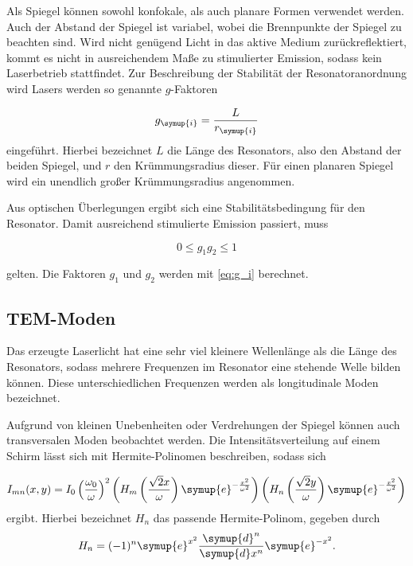 Als Spiegel können sowohl konfokale, als auch planare Formen verwendet werden. Auch der Abstand der Spiegel ist variabel, wobei die Brennpunkte der Spiegel zu beachten sind.
Wird nicht genügend Licht in das aktive Medium zurückreflektiert, kommt es nicht in ausreichendem Maße zu stimulierter Emission, sodass kein Laserbetrieb stattfindet.
Zur Beschreibung der Stabilität der Resonatoranordnung wird Lasers werden so genannte $g$-Faktoren

\begin{equation}
    g_{\symup{i}} = \frac{L}{r_{\symup{i}}}
    \label{eq:g_i}
\end{equation}
eingeführt. Hierbei bezeichnet $L$ die Länge des Resonators, also den Abstand der beiden Spiegel, und $r$ den Krümmungsradius dieser. Für einen planaren Spiegel wird ein unendlich großer
Krümmungsradius angenommen.

Aus optischen Überlegungen ergibt sich eine Stabilitätsbedingung für den Resonator. Damit ausreichend stimulierte Emission passiert, muss

\begin{equation}
    0 ≤ g_1g_2 ≤ 1
    \label{eq:g1g2}
\end{equation}

gelten. Die Faktoren $g_1$ und $g_2$ werden mit \eqref{eq:g_i} berechnet.

\subsection{TEM-Moden}
Das erzeugte Laserlicht hat eine sehr viel kleinere Wellenlänge als die Länge des Resonators, sodass mehrere Frequenzen im Resonator eine stehende Welle bilden können. Diese unterschiedlichen
Frequenzen werden als longitudinale Moden bezeichnet. 

Aufgrund von kleinen Unebenheiten oder Verdrehungen der Spiegel können auch transversalen Moden beobachtet werden. Die Intensitätsverteilung auf einem Schirm lässt sich mit Hermite-Polinomen beschreiben,
sodass sich

\begin{equation}
    I_{mn}(x,y) = I_0\left(\frac{\omega_0}{\omega}\right)^2\left(H_m\left(\frac{\sqrt{2}x}{\omega}\right)\symup{e}^{-\frac{x^2}{\omega^2}}\right)\left(H_n\left(\frac{\sqrt{2}y}{\omega}\right)\symup{e}^{-\frac{x^2}{\omega^2}}\right)
    \label{eq:I_mn}
\end{equation}
ergibt. Hierbei bezeichnet $H_n$ das passende Hermite-Polinom, gegeben durch
\begin{equation*}
    H_n = (-1)^{n}\symup{e}^{x^2}\frac{\symup{d}^n}{\symup{d}x^n}\symup{e}^{-x^2}.
\end{equation*}

